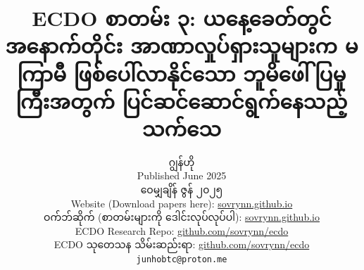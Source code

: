 \documentclass[10pt,twocolumn,letterpaper]{article}
\begin{document}
\title{ECDO စာတမ်း ၃: ယနေ့ခေတ်တွင် အနောက်တိုင်း အာဏာလှုပ်ရှားသူများက မကြာမီ ဖြစ်ပေါ်လာနိုင်သော ဘူမိဖေါ်ပြမှုကြီးအတွက် ပြင်ဆင်ဆောင်ရွက်နေသည့် သက်သေ}

\author{ဂျွန်ဟို\\

Published June 2025\\
ဝေမျှချိန် ဇွန် ၂၀၂၅\\
Website (Download papers here): \href{https://sovrynn.github.io}{sovrynn.github.io}\\
ဝက်ဘ်ဆိုက် (စာတမ်းများကို ဒေါင်းလုပ်လုပ်ပါ): \href{https://sovrynn.github.io}{sovrynn.github.io}\\
ECDO Research Repo: \href{https://github.com/sovrynn/ecdo}{github.com/sovrynn/ecdo}\\
ECDO သုတေသန သိမ်းဆည်းရာ: \href{https://github.com/sovrynn/ecdo}{github.com/sovrynn/ecdo}\\
{\tt\small junhobtc@proton.me}
}

\maketitle
\end{document}
